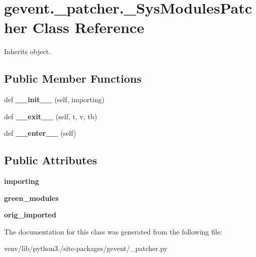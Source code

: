 \hypertarget{classgevent_1_1__patcher_1_1___sys_modules_patcher}{}\section{gevent.\+\_\+patcher.\+\_\+\+Sys\+Modules\+Patcher Class Reference}
\label{classgevent_1_1__patcher_1_1___sys_modules_patcher}


Inherits object.

\subsection*{Public Member Functions}
\begin{DoxyCompactItemize}
\item 
\mbox{\label{classgevent_1_1__patcher_1_1___sys_modules_patcher_acd0f64a37d63095f8ee97565114f992b}} 
def {\bfseries \+\_\+\+\_\+init\+\_\+\+\_\+} (self, importing)
\item 
\mbox{\label{classgevent_1_1__patcher_1_1___sys_modules_patcher_ac990399fb35fc34a783f0241f504f7c5}} 
def {\bfseries \+\_\+\+\_\+exit\+\_\+\+\_\+} (self, t, v, tb)
\item 
\mbox{\label{classgevent_1_1__patcher_1_1___sys_modules_patcher_aba99709ed148e36bb78197fc9edd8c73}} 
def {\bfseries \+\_\+\+\_\+enter\+\_\+\+\_\+} (self)
\end{DoxyCompactItemize}
\subsection*{Public Attributes}
\begin{DoxyCompactItemize}
\item 
\mbox{\label{classgevent_1_1__patcher_1_1___sys_modules_patcher_aad95c6a56a0a89eaf348e2a37fd022af}} 
{\bfseries importing}
\item 
\mbox{\label{classgevent_1_1__patcher_1_1___sys_modules_patcher_ade23a7d3939b768b5c1a4dc613d613a8}} 
{\bfseries green\+\_\+modules}
\item 
\mbox{\label{classgevent_1_1__patcher_1_1___sys_modules_patcher_aaa1c93abf93383f87e9a2bc8805b47cd}} 
{\bfseries orig\+\_\+imported}
\end{DoxyCompactItemize}


The documentation for this class was generated from the following file\+:\begin{DoxyCompactItemize}
\item 
venv/lib/python3./site-\/packages/gevent/\+\_\+patcher.\+py\end{DoxyCompactItemize}
